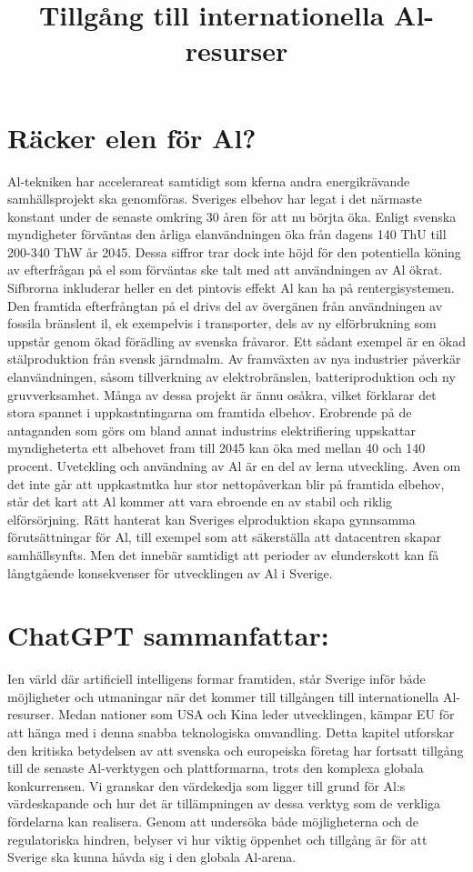 {{{{{{{{{{{{{\section*{Räcker elen för Al?}
Al-tekniken har accelerareat samtidigt som kferna andra energikrävande samhällsprojekt ska genomföras. Sveriges elbehov har legat i det närmaste konstant under de senaste omkring 30 åren för att nu börjta öka. Enligt svenska myndigheter förväntas den årliga elanvändningen öka från dagens 140 ThU till 200-340 ThW år 2045. Dessa siffror trar dock inte höjd för den potentiella köning av efterfrågan på el som förväntas ske talt med att användningen av Al ökrat. \({ }^{}\) Sifbrorna inkluderar heller en det pintovis effekt Al kan ha på rentergisystemen.
Den framtida efterfrångtan på el drivs del av övergänen från användningen av fossila bränslent il, ek exempelvis i transporter, dels av ny elförbrukning som uppstår genom ökad förädling av svenska fråvaror. Ett sådant exempel är en ökad stälproduktion från svensk järndmalm. Av framväxten av nya industrier påverkär
elanvändningen, såsom tillverkning av elektrobränslen, batteriproduktion och ny gruvverksamhet. Många av dessa projekt är ännu osåkra, vilket förklarar det stora spannet i uppkastntingarna om framtida elbehov. Erobrende på de antaganden som görs om bland annat industrins elektrifiering uppskattar myndigheterta ett albehovet fram till 2045 kan öka med mellan 40 och 140 procent.
Uvetckling och användning av Al är en del av lerna utveckling. Aven om det inte går att uppkastmtka hur stor nettopåverkan blir på framtida elbehov, står det kart att Al kommer att vara ebroende en av stabil och riklig elförsörjning. Rätt hanterat kan Sveriges elproduktion skapa gynnsamma förutsättningar för Al, till exempel som att säkerställa att datacentren skapar samhällsynfts. Men det innebär samtidigt att perioder av elunderskott kan få långtgående konsekvenser för utvecklingen av Al i Sverige.

\title{
Tillgång till internationella Al-resurser
}
\section*{ChatGPT sammanfattar:}
Ien värld där artificiell intelligens formar framtiden, står Sverige inför både möjligheter och utmaningar när det kommer till tillgången till internationella Al-resurser. Medan nationer som USA och Kina leder utvecklingen, kämpar EU för att hänga med i denna snabba teknologiska omvandling.
Detta kapitel utforskar den kritiska betydelsen av att svenska och europeiska företag har fortsatt tillgång till de senaste Al-verktygen och plattformarna, trots den komplexa globala konkurrensen. Vi granskar den värdekedja som ligger till grund för Al:s värdeskapande och hur det är tillämpningen av dessa verktyg som de verkliga fördelarna kan realisera. Genom att undersöka både möjligheterna och de regulatoriska hindren, belyser vi hur viktig öppenhet och tillgång är för att Sverige ska kunna håvda sig i den globala Al-arena.
}}}}}}}}}}}}}
